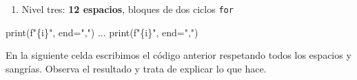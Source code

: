 \documentclass[
  spanish,
  letterpaper,
]{scrbook}
\newenvironment{Shaded}{\begin{snugshade}}{\end{snugshade}}
\newcommand{\BuiltInTok}[1]{\textcolor[rgb]{0.00,0.23,0.31}{#1}}
\newcommand{\NormalTok}[1]{\textcolor[rgb]{0.00,0.23,0.31}{#1}}
\newcommand{\OperatorTok}[1]{\textcolor[rgb]{0.37,0.37,0.37}{#1}}
\newcommand{\SpecialCharTok}[1]{\textcolor[rgb]{0.37,0.37,0.37}{#1}}
\newcommand{\SpecialStringTok}[1]{\textcolor[rgb]{0.13,0.47,0.30}{#1}}
\newcommand{\StringTok}[1]{\textcolor[rgb]{0.13,0.47,0.30}{#1}}
\providecommand{\tightlist}{%
  \setlength{\itemsep}{0pt}\setlength{\parskip}{0pt}}
\theoremstyle{definition}
\theoremstyle{remark}
\begin{document}
\begin{enumerate}
\def\labelenumi{\arabic{enumi}.}
\setcounter{enumi}{3}
\tightlist
\item
  Nivel tres: \textbf{12 espacios}, bloques de dos ciclos \texttt{for}
\end{enumerate}

\begin{Shaded}
\begin{Highlighting}[]
            \BuiltInTok{print}\NormalTok{(}\SpecialStringTok{f"}\SpecialCharTok{\{}\NormalTok{i}\SpecialCharTok{\}}\SpecialStringTok{"}\NormalTok{, end}\OperatorTok{=}\StringTok{","}\NormalTok{)}
\NormalTok{            ...}
            \BuiltInTok{print}\NormalTok{(}\SpecialStringTok{f"}\SpecialCharTok{\{}\NormalTok{i}\SpecialCharTok{\}}\SpecialStringTok{"}\NormalTok{, end}\OperatorTok{=}\StringTok{","}\NormalTok{)}
\end{Highlighting}
\end{Shaded}

En la siguiente celda escribimos el código anterior respetando todos los
espacios y sangrías. Observa el resultado y trata de explicar lo que
hace.
\end{document}
